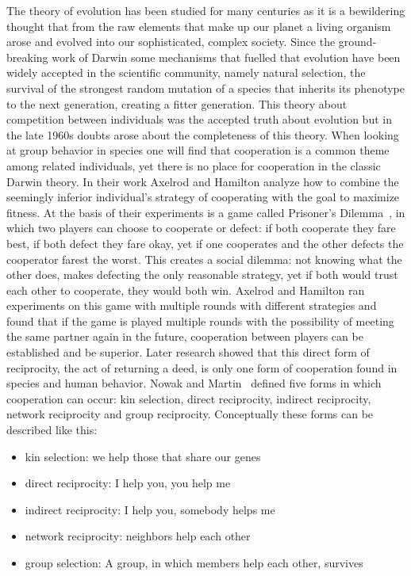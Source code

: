 The theory of evolution has been studied for many centuries as it is a bewildering thought that from
the raw elements that make up our planet a living organism arose and evolved into our sophisticated,
complex society. Since the ground-breaking work of Darwin some mechanisms that fuelled that
evolution have been widely accepted in the scientific community, namely natural selection, the 
survival of the strongest random mutation of a species that inherits its phenotype to the next 
generation, creating a fitter generation. This theory about competition between individuals was the
accepted truth about evolution but in the late 1960s doubts arose about the completeness of this 
theory. When looking at group behavior in species one will find that cooperation is a common theme
among related individuals, yet there is no place for cooperation in the classic Darwin 
theory.\cite{Axelrod1390} In their work Axelrod and Hamilton \cite{Axelrod1390} 
analyze how to combine the seemingly inferior individual's strategy of cooperating with the goal to 
maximize fitness. At the basis of their experiments is a game called Prisoner's 
Dilemma~\cite{chammah1965prisoner}, in which two players can choose to cooperate or defect: if both
cooperate they fare best, if both defect they fare okay, yet if one cooperates and the other defects
the cooperator farest the worst. This creates a social dilemma: not knowing what the other does,
makes defecting the only reasonable strategy, yet if both would trust each other to cooperate, they
would both win. Axelrod and Hamilton ran experiments on this game with multiple rounds with
different strategies and found that if the game is played multiple rounds with the possibility of 
meeting the same partner again in the future, cooperation between players can be established and be
superior. Later research showed that this direct form of reciprocity, the act of returning a deed,
is only one form of cooperation found in species and human behavior. Nowak and 
Martin~\cite{nowak2006five} defined five forms in which cooperation can occur: kin selection, direct
reciprocity, indirect reciprocity, network reciprocity and group reciprocity. Conceptually these 
forms can be described like this:

\begin{itemize}
    \item kin selection: we help those that share our genes
    \item direct reciprocity: I help you, you help me
    \item indirect reciprocity: I help you, somebody helps me
    \item network reciprocity: neighbors help each other
    \item group selection: A group, in which members help each other, survives
\end{itemize}

